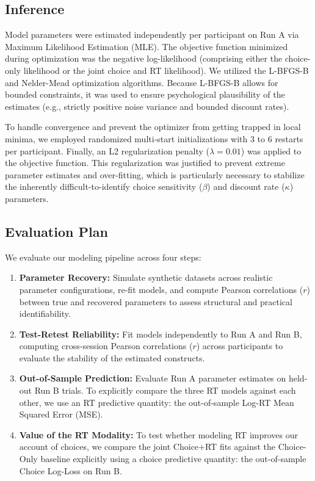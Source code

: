 \documentclass[11pt,a4paper]{article}
\theoremstyle{definition}
\begin{document}
\subsection{Inference}

Model parameters were estimated independently per participant on Run A via Maximum Likelihood Estimation (MLE). The objective function minimized during optimization was the negative log-likelihood (comprising either the choice-only likelihood or the joint choice and RT likelihood). We utilized the L-BFGS-B and Nelder-Mead optimization algorithms. Because L-BFGS-B allows for bounded constraints, it was used to ensure psychological plausibility of the estimates (e.g., strictly positive noise variance and bounded discount rates).

To handle convergence and prevent the optimizer from getting trapped in local minima, we employed randomized multi-start initializations with 3 to 6 restarts per participant. Finally, an L2 regularization penalty ($\lambda = 0.01$) was applied to the objective function. This regularization was justified to prevent extreme parameter estimates and over-fitting, which is particularly necessary to stabilize the inherently difficult-to-identify choice sensitivity ($\beta$) and discount rate ($\kappa$) parameters.

\subsection{Evaluation Plan}

We evaluate our modeling pipeline across four steps:
\begin{enumerate}
    \item \textbf{Parameter Recovery:} Simulate synthetic datasets across realistic parameter configurations, re-fit models, and compute Pearson correlations ($r$) between true and recovered parameters to assess structural and practical identifiability.
    \item \textbf{Test-Retest Reliability:} Fit models independently to Run A and Run B, computing cross-session Pearson correlations ($r$) across participants to evaluate the stability of the estimated constructs.
    \item \textbf{Out-of-Sample Prediction:} Evaluate Run A parameter estimates on held-out Run B trials. To explicitly compare the three RT models against each other, we use an RT predictive quantity: the out-of-sample Log-RT Mean Squared Error (MSE).
    \item \textbf{Value of the RT Modality:} To test whether modeling RT improves our account of choices, we compare the joint Choice+RT fits against the Choice-Only baseline explicitly using a choice predictive quantity: the out-of-sample Choice Log-Loss on Run B.
\end{enumerate}
\end{document}

